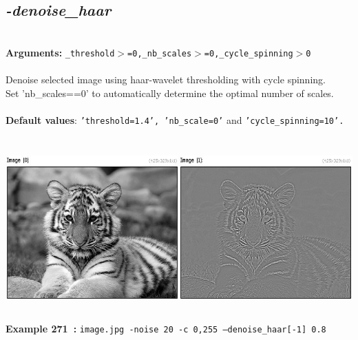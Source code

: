 \documentclass[a4paper,11pt,twoside]{book}
\begin{document}
\subsection{\emph{-denoise\_haar} }\vspace*{-0.5em}
~\\\textbf{Arguments: } 
{\small \texttt{\_threshold$>$=0,\_nb\_scales$>$=0,\_cycle\_spinning$>$0}}\\~\\
Denoise selected image using haar-wavelet thresholding with cycle spinning.
~\\Set 'nb\_scales==0' to automatically determine the optimal number of scales.
~\\~\\\textbf{Default values}: {\small \texttt{'threshold=1.4', 'nb\_scale=0'} and \texttt{'cycle\_spinning=10'.}}
\begin{center}\includegraphics[keepaspectratio=true,height=7cm,width=\textwidth]{img/gmic_def271.jpg}\\
{\footnotesize \textbf{Example 271~:} \texttt{image.jpg -noise 20 -c 0,255 --denoise\_haar[-1] 0.8}}
\end{center}
\end{document}
